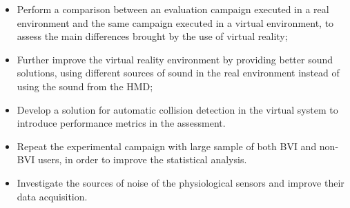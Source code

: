 \begin{itemize}
    \item Perform a comparison between an evaluation campaign executed in a real environment and the same campaign executed in a virtual environment, to assess the main differences brought by the use of virtual reality;
    \item Further improve the virtual reality environment by providing better sound solutions, using different sources of sound in the real environment instead of using the sound from the HMD;
    \item Develop a solution for automatic collision detection in the virtual system to introduce performance metrics in the assessment.
    \item Repeat the experimental campaign with large sample of both BVI and non-BVI users, in order to improve the statistical analysis.
    \item Investigate the sources of noise of the physiological sensors and improve their data acquisition.
\end{itemize}